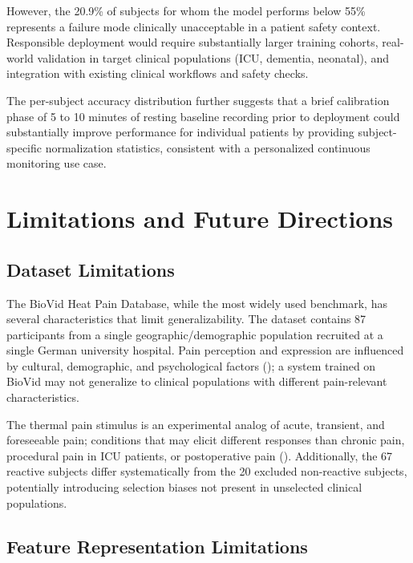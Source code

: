 \documentclass[10pt, twocolumn]{article}
\begin{document}
However, the 20.9\% of subjects for whom the model performs below 55\% represents a
failure mode clinically unacceptable in a patient safety context. Responsible deployment
would require substantially larger training cohorts, real-world validation in target
clinical populations (ICU, dementia, neonatal), and integration with existing clinical
workflows and safety checks.

The per-subject accuracy distribution further suggests that a brief calibration phase of
5 to 10 minutes of resting baseline recording prior to deployment could substantially
improve performance for individual patients by providing subject-specific normalization
statistics, consistent with a personalized continuous monitoring use case.

\FloatBarrier
\section{Limitations and Future Directions}
\label{sec:limitations}

\subsection{Dataset Limitations}

The BioVid Heat Pain Database, while the most widely used benchmark, has several
characteristics that limit generalizability. The dataset contains 87 participants from a
single geographic/demographic population recruited at a single German university hospital.
Pain perception and expression are influenced by cultural, demographic, and psychological
factors (\cite{Turk2010}); a system trained on BioVid may not generalize to clinical
populations with different pain-relevant characteristics.

The thermal pain stimulus is an experimental analog of acute, transient, and foreseeable
pain; conditions that may elicit different responses than chronic pain, procedural pain in
ICU patients, or postoperative pain (\cite{Lichtner2014}). Additionally, the 67 reactive
subjects differ systematically from the 20 excluded non-reactive subjects, potentially
introducing selection biases not present in unselected clinical populations.

\subsection{Feature Representation Limitations}
\end{document}
